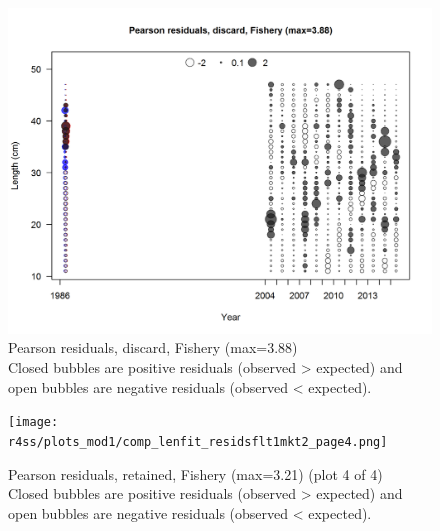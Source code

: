 \documentclass[12pt,]{article}
\begin{document}
\begin{figure}
\centering
\includegraphics{r4ss/plots_mod1/comp_lenfit_residsflt1mkt1.png}
\caption{Pearson residuals, discard, Fishery (max=3.88)\\
Closed bubbles are positive residuals (observed \textgreater{} expected)
and open bubbles are negative residuals (observed \textless{} expected).
\label{fig:discard_len_pearson}}
\end{figure}

\begin{figure}
\centering
\texttt{[image: r4ss/plots\_mod1/comp\_lenfit\_residsflt1mkt2\_page4.png]}
\caption{Pearson residuals, retained, Fishery (max=3.21) (plot 4 of 4)\\
Closed bubbles are positive residuals (observed \textgreater{} expected)
and open bubbles are negative residuals (observed \textless{} expected).
\label{fig:fishery_len_pearson}}
\end{figure}
\end{document}
